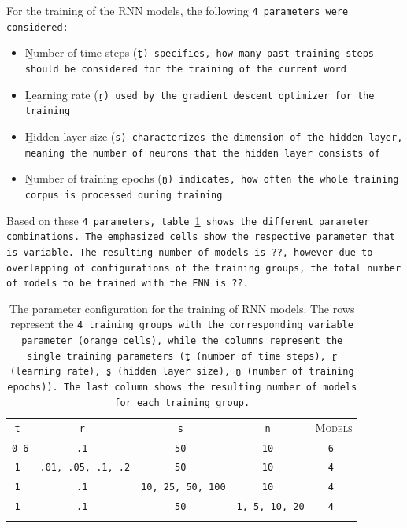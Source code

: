 For the training of the RNN models, the following \tt{4} parameters were considered:

\begin{itemize}
	\item \b{Number of time steps} (\tt{\b{t}}) specifies, how many past training steps should be considered for the training of the current word
	\item \b{Learning rate} (\tt{\b{r}}) used by the gradient descent optimizer for the training
	\item \b{Hidden layer size} (\tt{\b{s}}) characterizes the dimension of the hidden layer, meaning the number of neurons that the hidden layer consists of
	\item \b{Number of training epochs} (\tt{\b{n}}) indicates, how often the whole training corpus is processed during training
\end{itemize}

Based on these \tt{4} parameters, table \ref{t.training.tuning.rnn} shows the different parameter combinations. The emphasized cells show the respective parameter that is variable. The resulting number of models is \tt{??}, however due to overlapping of configurations of the training groups, the total number of models to be trained with the FNN is \tt{??}.

\begin{table}[ht]
	\vspace{2em}
	\centering\small{}\begin{tabular}{ c c c c c }
	\trule
	\tt{t} & \tt{r} & \tt{s} & \tt{n} & \textsc{Models} \\
	\drule
	\cellcolor{orange}\color{white}\b{\tt{0}--\tt{6}} & \tt{.1} & \tt{50} & \tt{10} & \tt{6} \\
	\mrule
	\tt{1} & \cellcolor{orange}\color{white}\b{\tt{.01}, \tt{.05}, \tt{.1}, \tt{.2}} & \tt{50} & \tt{10} & \tt{4} \\
	\mrule
	\tt{1} & \tt{.1} & \cellcolor{orange}\color{white}\b{\tt{10}, \tt{25}, \tt{50}, \tt{100}} & \tt{10} & \tt{4} \\
	\mrule
	\tt{1} & \tt{.1} & \tt{50} & \cellcolor{orange}\color{white}\b{\tt{1}, \tt{5}, \tt{10}, \tt{20}} & \tt{4} \\
	\brule
	\end{tabular}
	\caption[Parameter combinations of RNN Models]{The parameter configuration for the training of RNN models. The rows represent the \tt{4} training groups with the corresponding variable parameter (orange cells), while the columns represent the single training parameters (\tt{\b{t}} (number of time steps), \tt{\b{r}} (learning rate), \tt{\b{s}} (hidden layer size), \tt{\b{n}} (number of training epochs)). The last column shows the resulting number of models for each training group.}
	\label{t.training.tuning.rnn}
\end{table}


